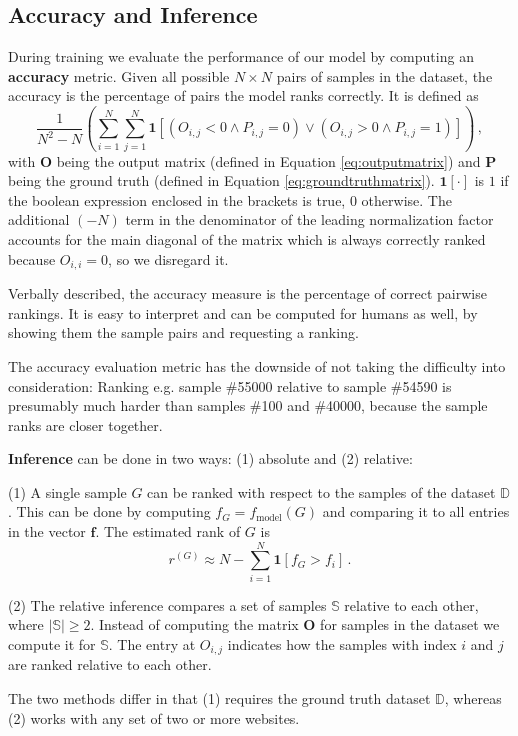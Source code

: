 \subsection{Accuracy and Inference}
\label{sec:accuracy}

During training we evaluate the performance of our model by computing an \textbf{accuracy} metric. Given all possible $N\times N$ pairs of samples in the dataset, the accuracy is the percentage of pairs the model ranks correctly. It is defined as \begin{equation}\label{eq:acc}
    \frac{1}{N^2-N}\left(\sum_{i=1}^N\sum_{j=1}^N\bm{1}\left[\left(O_{i,j}<0\land P_{i,j}=0\right)\lor\left(O_{i,j}>0\land P_{i,j}=1\right)\right]\right)\,,
\end{equation}with $\bm{O}$ being the output matrix (defined in Equation \ref{eq:outputmatrix}) and $\bm{P}$ being the ground truth (defined in Equation \ref{eq:groundtruthmatrix}). $\bm{1}\left[\cdot\right]$ is $1$ if the boolean expression enclosed in the brackets is true, $0$ otherwise. The additional $(-N)$ term in the denominator of the leading normalization factor accounts for the main diagonal of the matrix which is always correctly ranked because $O_{i,i}=0$, so we disregard it.

Verbally described, the accuracy measure is the percentage of correct pairwise rankings. It is easy to interpret and can be computed for humans as well, by showing them the sample pairs and requesting a ranking.

The accuracy evaluation metric has the downside of not taking the difficulty into consideration: Ranking e.g. sample \#55000 relative to sample \#54590 is presumably much harder than samples \#100 and \#40000, because the sample ranks are closer together.

\textbf{Inference} can be done in two ways: (1) absolute and (2) relative:

(1) A single sample $G$ can be ranked with respect to the samples of the dataset $\mathbb{D}$. This can be done by computing $f_G=f_\text{model}(G)$ and comparing it to all entries in the vector $\bm{f}$. The estimated rank of $G$ is \begin{equation}
    \label{eq:inference}
    r^{(G)}\approx N-\sum_{i=1}^N\bm{1}\left[f_G>f_i\right]\,.
\end{equation}

(2) The relative inference compares a set of samples $\mathbb{S}$ relative to each other, where $\left\lvert\mathbb{S}\right\rvert\ge2$. Instead of computing the matrix $\bm{O}$ for samples in the dataset we compute it for $\mathbb{S}$. The entry at $O_{i,j}$ indicates how the samples with index $i$ and $j$ are ranked relative to each other.

The two methods differ in that (1) requires the ground truth dataset $\mathbb{D}$, whereas (2) works with any set of two or more websites.
